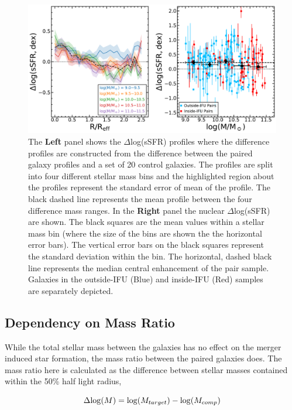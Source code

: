 \documentclass[iop,revtex4,twocolumn,apj,numberedappendix,appendixfloats]{emulateapj}
\begin{document}
\begin{figure}
\centering
\includegraphics[width=\linewidth]{fig/ssfr_mass.pdf}
\caption[]{The \textbf{Left} panel shows the $\Delta$log(sSFR) profiles where the difference profiles are constructed from the difference between the paired galaxy profiles and a set of 20 control galaxies. The profiles are split into four different stellar mass bins and the highlighted region about the profiles represent the standard error of mean of the profile. The black dashed line represents the mean profile between the four difference mass ranges. In the \textbf{Right} panel the nuclear $\Delta$log(sSFR) are shown. The black squares are the mean values within a stellar mass bin (where the size of the bins are shown the the horizontal error bars). The vertical error bars on the black squares represent the standard deviation within the bin. The horizontal, dashed black line represents the median central enhancement of the pair sample. Galaxies in the outside-IFU (Blue) and inside-IFU (Red) samples are separately depicted.}
\label{fig:ssfr_mass}
\end{figure}

\subsection{Dependency on Mass Ratio}
While the total stellar mass between the galaxies has no effect on the merger induced star formation, the mass ratio between the paired galaxies does. The mass ratio here is calculated as the difference between stellar masses contained within the 50\% half light radius, 

\begin{equation}
\Delta {\rm log}(M) = {\rm log}(M_{target}) - {\rm log}(M_{comp}) 
\end{equation}
\end{document}
